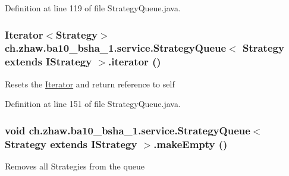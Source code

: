 Definition at line 119 of file StrategyQueue.java.\hypertarget{classch_1_1zhaw_1_1ba10__bsha__1_1_1service_1_1StrategyQueue_3_01Strategy_01extends_01IStrategy_01_4_af8e5c776860033a81d2a3f3b35ecf28d}{
\subsubsection[{iterator}]{\setlength{\rightskip}{0pt plus 5cm}Iterator$<$Strategy$>$ ch.zhaw.ba10\_\-bsha\_\-1.service.StrategyQueue$<$ Strategy extends {\bf IStrategy} $>$.iterator ()}}
\label{classch_1_1zhaw_1_1ba10__bsha__1_1_1service_1_1StrategyQueue_3_01Strategy_01extends_01IStrategy_01_4_af8e5c776860033a81d2a3f3b35ecf28d}
Resets the \hyperlink{}{Iterator} and return reference to self 

Definition at line 151 of file StrategyQueue.java.\hypertarget{classch_1_1zhaw_1_1ba10__bsha__1_1_1service_1_1StrategyQueue_3_01Strategy_01extends_01IStrategy_01_4_a727c27ccaed1755ff77994dc4b4d50a2}{
\subsubsection[{makeEmpty}]{\setlength{\rightskip}{0pt plus 5cm}void ch.zhaw.ba10\_\-bsha\_\-1.service.StrategyQueue$<$ Strategy extends {\bf IStrategy} $>$.makeEmpty ()}}
\label{classch_1_1zhaw_1_1ba10__bsha__1_1_1service_1_1StrategyQueue_3_01Strategy_01extends_01IStrategy_01_4_a727c27ccaed1755ff77994dc4b4d50a2}
Removes all Strategies from the queue 

